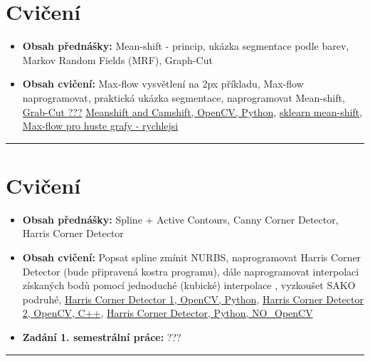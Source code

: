 \documentclass[12pt, a4paper]{article}
\begin{document}
\section{Cvičení}
\begin{itemize}
	\item \par{ \textbf{Obsah přednášky:} Mean-shift - princip, ukázka segmentace podle barev, Markov Random Fields (MRF), Graph-Cut}
	\item \par{\textbf{Obsah cvičení:} Max-flow vysvětlení na 2px příkladu, Max-flow naprogramovat, praktická ukázka segmentace, naprogramovat Mean-shift, \href{http://docs.opencv.org/trunk/doc/py_tutorials/py_imgproc/py_grabcut/py_grabcut.html}{Grab-Cut {\color{red}???}} \href{http://docs.opencv.org/trunk/doc/py_tutorials/py_video/py_meanshift/py_meanshift.html}{Meanshift and Camshift, OpenCV, Python}, \href{http://scikit-learn.org/stable/auto_examples/cluster/plot_cluster_comparison.html}{sklearn mean-shift}, \href{http://research.microsoft.com/pubs/150437/ibfs-proc.pdf}{Max-flow pro huste grafy - rychlejsi}}
\end{itemize}
\noindent\rule[0.5ex]{\linewidth}{0.4pt}











\section{Cvičení}
\begin{itemize}
	\item \par{\textbf{Obsah přednášky:} Spline + Active Contours, Canny Corner Detector, Harris Corner Detector}
	\item \par{\textbf{Obsah cvičení:} Popsat spline zmínit NURBS, naprogramovat Harris Corner Detector (bude připravená kostra programu), dále naprogramovat interpolaci získaných bodů pomocí jednoduché (kubické) interpolace , vyzkoušet SAKO podruhé, \href{http://docs.opencv.org/master/doc/py_tutorials/py_feature2d/py_features_harris/py_features_harris.html}{Harris Corner Detector 1, OpenCV, Python}, \href{http://docs.opencv.org/doc/tutorials/features2d/trackingmotion/harris_detector/harris_detector.html}{Harris Corner Detector 2, OpenCV, C++}}, \href{http://www.janeriksolem.net/2009/01/harris-corner-detector-in-python.html}{Harris Corner Detector, Python, NO\_OpenCV}
	\item \par{\textbf{Zadání 1. semestrální práce:} {\color{red} ???}}
\end{itemize}
\noindent\rule[0.5ex]{\linewidth}{0.4pt}
\end{document}
